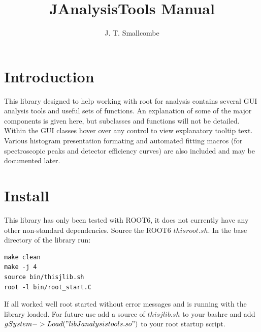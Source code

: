 \documentclass[a4paper,10pt]{article}
\title{JAnalysisTools Manual}
\author{J. T. Smallcombe}
\begin{document}
\maketitle
\tableofcontents

\section{Introduction}
This library designed to help working with root for analysis contains several GUI analysis tools and useful sets of functions. An explanation of some of the major components is given here, but subclasses and functions will not be detailed.
Within the GUI classes hover over any control to view explanatory tooltip text.
Various histogram presentation formating and automated fitting macros (for spectroscopic peaks and detector efficiency curves) are also included and may be documented later. 

\section{Install}
This library has only been tested with ROOT6, it does not currently have any other non-standard dependencies.
Source the ROOT6 $thisroot.sh$.
In the base directory of the library run:
\lstset{language=bash}
\begin{lstlisting}
make clean
make -j 4
source bin/thisjlib.sh
root -l bin/root_start.C
\end{lstlisting}
If all worked well root started without error messages and is running with the library loaded.
For future use add a source of $thisjlib.sh$ to your bashrc and add $gSystem->Load("libJanalysistools.so")$ to your root startup script.

\newpage
\end{document}
